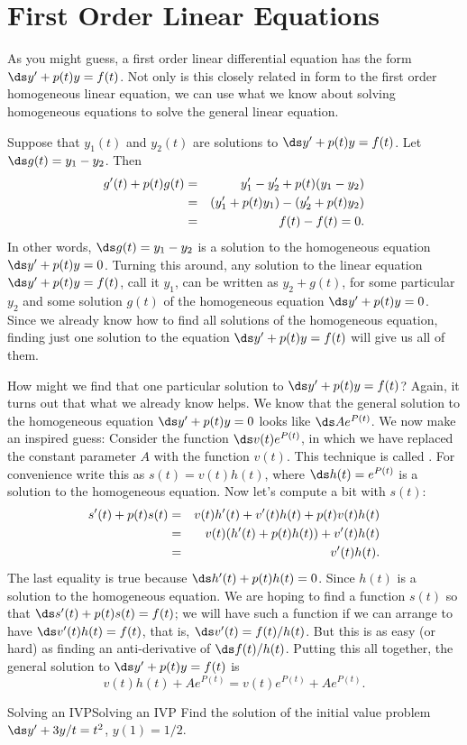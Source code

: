 \section{First Order Linear Equations}{}{}\label{sec:first order linear}
As you might guess, a first order linear differential equation has the form 
$\ds y' + p(t)y = f(t)$. Not only is this closely related in form
to the first order homogeneous linear equation, we can use what we
know about solving homogeneous equations to solve the general linear
equation. 

Suppose that $y_1(t)$ and $y_2(t)$ are solutions to 
$\ds y' + p(t)y = f(t)$. Let $\ds g(t)=y_1-y_2$. Then
\begin{eqnarray*}
 g'(t)+p(t)g(t)&=&y_1'-y_2'+p(t)(y_1-y_2)\cr
&=&(y_1'+p(t)y_1)-(y_2'+p(t)y_2)\cr
&=&f(t)-f(t)=0.
\end{eqnarray*}
In other words, $\ds g(t)=y_1-y_2$ is a solution to the homogeneous
equation $\ds y' + p(t)y = 0$. Turning this around, any solution
to the linear equation $\ds y' + p(t)y = f(t)$, call it $y_1$, can
be written as $y_2+g(t)$, for some particular $y_2$ and some solution
$g(t)$ of the homogeneous equation $\ds y' + p(t)y = 0$. Since we
already know how to find all solutions of the homogeneous equation,
finding just one solution to the equation $\ds y' + p(t)y = f(t)$
will give us all of them.

How might we find that one particular solution to $\ds y' + p(t)y
= f(t)$? Again, it turns out that what we already know helps. We know
that the general solution to the homogeneous equation
$\ds y' + p(t)y = 0$ looks like $\ds Ae^{P(t)}$. We now make an
inspired guess: Consider the function $\ds v(t)e^{P(t)}$, in which we
have replaced the constant parameter $A$ with the function
$v(t)$. This technique is called 
.
For
convenience write this as $s(t)=v(t)h(t)$, where $\ds h(t)=e^{P(t)}$ 
is a solution to the
homogeneous equation. Now let's compute a bit with $s(t)$:
\begin{eqnarray*}
s'(t)+p(t)s(t)&=&v(t)h'(t)+v'(t)h(t)+p(t)v(t)h(t)\cr
&=&v(t)(h'(t)+p(t)h(t)) + v'(t)h(t)\cr
&=&v'(t)h(t).\end{eqnarray*}
The last equality is true because $\ds h'(t)+p(t)h(t)=0$. Since $h(t)$
is a solution to the homogeneous equation. We are hoping to find a
function $s(t)$ so that $\ds s'(t)+p(t)s(t)=f(t)$; we will have such a
function if we can arrange to have $\ds v'(t)h(t)=f(t)$, that is,
$\ds v'(t)=f(t)/h(t)$. But this is as easy (or hard) as finding an
anti-derivative of $\ds f(t)/h(t)$. Putting this all together, the
general solution to $\ds y' + p(t)y = f(t)$ is
$$v(t)h(t)+Ae^{P(t)} = v(t)e^{P(t)}+Ae^{P(t)}.$$
\begin{example}{Solving an IVP}{Solving an IVP}\label{Solving an IVP}
 Find the solution of the initial value problem
$\ds y'+3y/t=t^2$, $y(1)=1/2$. 
\end{example}

